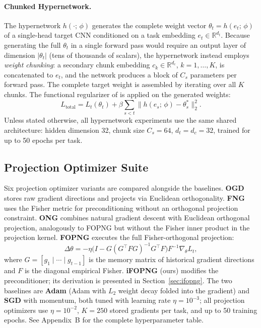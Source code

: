\paragraph{Chunked Hypernetwork.}
The hypernetwork $h(\cdot;\,\phi)$ generates the complete weight vector
$\theta_t = h(e_t;\,\phi)$ of a single-head target CNN conditioned on a
task embedding $e_t \in \mathbb{R}^{d_t}$.  Because generating the full
$\theta_t$ in a single forward pass would require an output layer of dimension
$|\theta_t|$ (tens of thousands of scalars), the hypernetwork instead employs
\emph{weight chunking}: a secondary chunk embedding
$c_k \in \mathbb{R}^{d_c}$, $k=1,\ldots,K$, is concatenated to $e_t$, and the
network produces a block of $C_s$ parameters per forward pass.  The complete
target weight is assembled by iterating over all $K$ chunks.  The functional
regularizer of \citet{oswald_continual_2022} is applied on the generated
weights:
\begin{equation}
    L_{\text{total}} = L_t(\theta_t)
    + \beta \sum_{s < t} \bigl\|h(e_s;\,\phi) - \theta_s^*\bigr\|_2^2.
\end{equation}
Unless stated otherwise, all hypernetwork experiments use the same shared
architecture: hidden dimension 32, chunk size $C_s = 64$,
$d_t = d_c = 32$, trained for up to 50 epochs per task.

\subsection{Projection Optimizer Suite}
Six projection optimizer variants are compared alongside the baselines.
\textbf{OGD} \citep{farajtabar_orthogonal_2019} stores raw gradient directions
and projects via Euclidean orthogonality.
\textbf{FNG} uses the Fisher metric for preconditioning without an orthogonal
projection constraint.
\textbf{ONG} combines natural gradient descent with Euclidean orthogonal
projection, analogously to FOPNG but without the Fisher inner product in the
projection kernel.
\textbf{FOPNG} \citep{garg_fisher-orthogonal_2026} executes the full
Fisher-orthogonal projection:
\begin{equation}
    \Delta\theta = -\eta
    \bigl(I - G(G^\top F G)^{-1} G^\top F\bigr)
    F^{-1}\nabla_\theta L_t,
\end{equation}
where $G = [g_1 \mid \cdots \mid g_{t-1}]$ is the memory matrix of historical
gradient directions and $F$ is the diagonal empirical Fisher.
\textbf{iFOPNG} (ours) modifies the preconditioner; its derivation is presented
in Section~\ref{sec:ifopng}.
The two baselines are \textbf{Adam} (Adam with $L_2$ weight decay folded into
the gradient) and \textbf{SGD} with momentum, both tuned with learning rate
$\eta = 10^{-3}$; all projection optimizers use $\eta = 10^{-2}$, $K = 250$
stored gradients per task, and up to 50 training epochs.  See Appendix~B for
the complete hyperparameter table.

